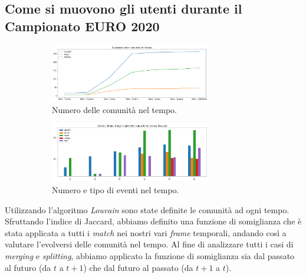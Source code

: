    \subsection{Come si muovono gli utenti durante il Campionato EURO 2020}
    
    \begin{figure}
        \centering
        \begin{subfigure}{.45\textwidth}
            \centering
            \includegraphics[width=7cm] {4_Community_discovery/community_evolution.png}
        \caption{Numero delle comunità nel tempo.}
        \label{community_evolution}
        \end{subfigure}
        \centering
        \begin{subfigure}{.45\textwidth}
            \centering
           \includegraphics[width=7cm] {4_Community_discovery/log_communities_events.png}
        \caption{Numero e tipo di eventi nel tempo.}
        \label{community_evolution_1}
        \end{subfigure}
        \caption{}
        \label{fig:community}
    \end{figure}
    
    Utilizzando l’algoritmo \textit{Louvain} sono state definite le comunità ad ogni tempo. Sfruttando l'indice di Jaccard, abbiamo definito una funzione di somiglianza che è stata applicata a tutti i \textit{match} nei nostri vari \textit{frame} temporali, andando così a valutare l'evolversi delle comunità nel tempo. Al fine di analizzare tutti i casi di \textit{merging} e \textit{splitting}, abbiamo applicato la funzione di somiglianza sia dal passato al futuro (da $t$ a $t+1$) che dal futuro al passato (da $t+1$ a $t$).
    
